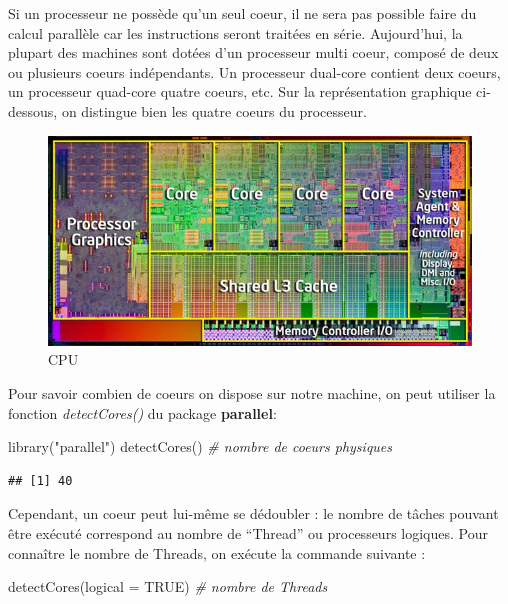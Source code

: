 \documentclass[
]{book}
\newenvironment{Shaded}{\begin{snugshade}}{\end{snugshade}}
\newcommand{\AttributeTok}[1]{\textcolor[rgb]{0.77,0.63,0.00}{#1}}
\newcommand{\CommentTok}[1]{\textcolor[rgb]{0.56,0.35,0.01}{\textit{#1}}}
\newcommand{\ConstantTok}[1]{\textcolor[rgb]{0.00,0.00,0.00}{#1}}
\newcommand{\FunctionTok}[1]{\textcolor[rgb]{0.00,0.00,0.00}{#1}}
\newcommand{\NormalTok}[1]{#1}
\newcommand{\StringTok}[1]{\textcolor[rgb]{0.31,0.60,0.02}{#1}}
\theoremstyle{definition}
\theoremstyle{definition}
\theoremstyle{definition}
\theoremstyle{definition}
\theoremstyle{remark}
\begin{document}
Si un processeur ne possède qu'un seul coeur, il ne sera pas possible faire du calcul parallèle car les instructions seront traitées en série. Aujourd'hui, la plupart des machines sont dotées d'un processeur multi coeur, composé de deux ou plusieurs coeurs indépendants. Un processeur dual-core contient deux coeurs, un processeur quad-core quatre coeurs, etc. Sur la représentation graphique ci-dessous, on distingue bien les quatre coeurs du processeur.

\begin{figure}
\centering
\includegraphics{Figures/cpu.jpg}
\caption{CPU}
\end{figure}

Pour savoir combien de coeurs on dispose sur notre machine, on peut utiliser la fonction \emph{detectCores()} du package \textbf{parallel}:

\begin{Shaded}
\begin{Highlighting}[]
\FunctionTok{library}\NormalTok{(}\StringTok{"parallel"}\NormalTok{)}
\FunctionTok{detectCores}\NormalTok{() }\CommentTok{\# nombre de coeurs physiques}
\end{Highlighting}
\end{Shaded}

\begin{verbatim}
## [1] 40
\end{verbatim}

Cependant, un coeur peut lui-même se dédoubler : le nombre de tâches pouvant être exécuté correspond au nombre de ``Thread'' ou processeurs logiques. Pour connaître le nombre de Threads, on exécute la commande suivante :

\begin{Shaded}
\begin{Highlighting}[]
\FunctionTok{detectCores}\NormalTok{(}\AttributeTok{logical =} \ConstantTok{TRUE}\NormalTok{) }\CommentTok{\# nombre de Threads}
\end{Highlighting}
\end{Shaded}
\end{document}
